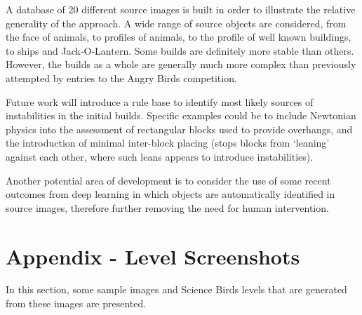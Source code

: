 \documentclass{dalthesis}
\begin{document}
A database of 20 different source images is built in order to illustrate the relative generality of the approach. A wide range of source objects are considered, from the face of animals, to profiles of animals, to the profile of well known buildings, to ships and Jack-O-Lantern. Some builds are definitely more stable than others. However, the builds as a whole are generally much more complex than previously attempted by entries to the Angry Birds competition.

Future work will introduce a rule base to identify most likely sources of instabilities in the initial builds. Specific examples could be to include Newtonian physics into the assessment of rectangular blocks used to provide overhangs, and the introduction of minimal inter-block placing (stops blocks from `leaning' against each other, where such leans appears to introduce instabilities).

Another potential area of development is to consider the use of some recent outcomes from deep learning in which objects are automatically identified in source images, therefore further removing the need for human intervention.
\appendix
\chapter{Appendix - Level Screenshots}\label{sec:appendix}

In this section, some sample images and Science Birds levels that are generated from these images are presented.
\end{document}
